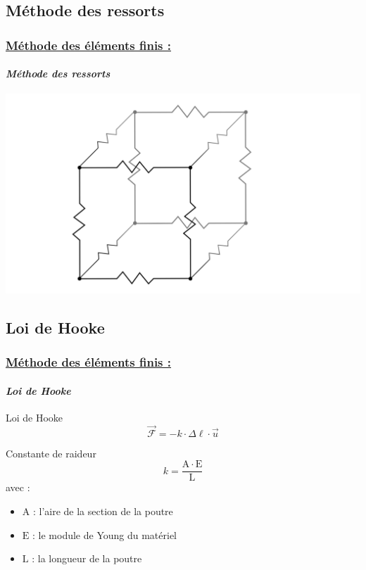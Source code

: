 \documentclass[10pt]{beamer}
\begin{document}
	\subsection{M\'ethode des ressorts}
	\begin{frame}
		\frametitle{\uline{M\'ethode des \'el\'ements finis :}}
		\framesubtitle{\textit{M\'ethode des ressorts}}
		\centering
  		\includegraphics[scale=0.84]{Images/cube.png}
	\end{frame}
	\subsection{Loi de Hooke}
	\begin{frame}
		\frametitle{\uline{M\'ethode des \'el\'ements finis :}}
		\framesubtitle{\textit{Loi de Hooke}}
		\begin{block}{Loi de Hooke}
			\begin{equation}
  				\vec{\mathcal{F}} = - k \cdot \Delta \ell \cdot \vec{u}
  			\end{equation}
		\end{block}
		\begin{block}{Constante de raideur}
			\begin{equation}
				k = \frac{\mathrm{A} \cdot \mathrm{E}}{\mathrm{L}}
			\end{equation}
			avec :\\
  			\begin{itemize}
  				\item $\mathrm{A}$ : l'aire de la section de la poutre
  				\item $\mathrm{E}$ : le module de Young du matériel
  				\item $\mathrm{L}$ : la longueur de la poutre
  			\end{itemize}
		\end{block}
	\end{frame}
\end{document}
